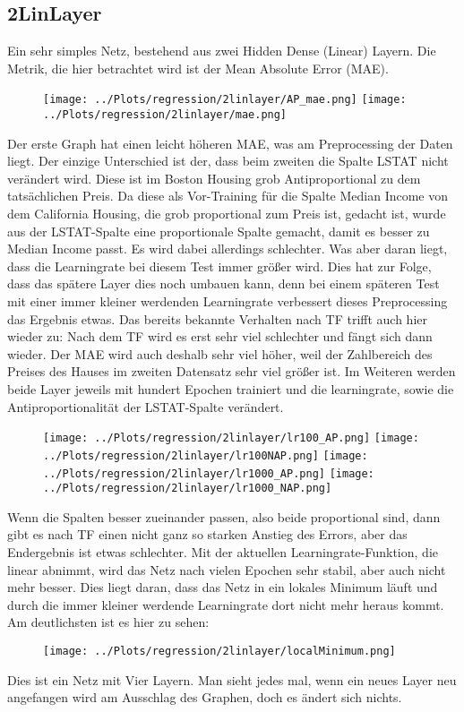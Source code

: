 \subsection{2LinLayer}
    Ein sehr simples Netz, bestehend aus zwei Hidden Dense (Linear) Layern. 
    Die Metrik, die hier betrachtet wird ist der Mean Absolute Error (MAE). 
    \begin{figure}[htpb]
        \texttt{[image: ../Plots/regression/2linlayer/AP\_mae.png]}
        \texttt{[image: ../Plots/regression/2linlayer/mae.png]}
    \end{figure}
    Der erste Graph hat einen leicht höheren MAE, was am Preprocessing der Daten liegt. 
    Der einzige Unterschied ist der, dass beim zweiten die Spalte LSTAT nicht verändert wird. 
    Diese ist im Boston Housing grob Antiproportional zu dem tatsächlichen Preis. Da diese als 
    Vor-Training für die Spalte Median Income von dem California Housing, die grob proportional 
    zum Preis ist, gedacht ist, wurde aus der LSTAT-Spalte eine proportionale Spalte gemacht, 
    damit es besser zu Median Income passt. Es wird dabei allerdings schlechter. 
    Was aber daran liegt, dass die Learningrate bei diesem Test immer größer wird. Dies hat zur 
    Folge, dass das spätere Layer dies noch umbauen kann, denn bei einem späteren Test mit 
    einer immer kleiner werdenden Learningrate verbessert dieses Preprocessing das 
    Ergebnis etwas. 
    Das bereits bekannte Verhalten nach TF trifft auch hier wieder zu: Nach dem TF wird es 
    erst sehr viel schlechter und fängt sich dann wieder. 
    Der MAE wird auch deshalb sehr viel höher, weil der Zahlbereich des Preises des Hauses im 
    zweiten Datensatz sehr viel größer ist.
    Im Weiteren werden beide Layer jeweils mit hundert Epochen trainiert und die learningrate, 
    sowie die Antiproportionalität der LSTAT-Spalte verändert. 
    \begin{figure}[htpb]
        \texttt{[image: ../Plots/regression/2linlayer/lr100\_AP.png]}
        \texttt{[image: ../Plots/regression/2linlayer/lr100NAP.png]}
        \texttt{[image: ../Plots/regression/2linlayer/lr1000\_AP.png]}
        \texttt{[image: ../Plots/regression/2linlayer/lr1000\_NAP.png]}
    \end{figure}
    Wenn die Spalten besser zueinander passen, also beide proportional sind, dann gibt es nach TF 
    einen nicht ganz so starken Anstieg des Errors, aber das Endergebnis ist etwas schlechter. 
    Mit der aktuellen Learningrate-Funktion, die linear abnimmt, wird das Netz nach vielen Epochen 
    sehr stabil, aber auch nicht mehr besser. 
    Dies liegt daran, dass das Netz in ein lokales Minimum läuft und durch die immer kleiner 
    werdende Learningrate dort nicht mehr heraus kommt. Am deutlichsten ist es hier zu sehen: 
    \begin{figure}[htpb]
        \texttt{[image: ../Plots/regression/2linlayer/localMinimum.png]}
    \end{figure}
    Dies ist ein Netz mit Vier Layern. Man sieht jedes mal, wenn ein neues Layer neu angefangen wird 
    am Ausschlag des Graphen, doch es ändert sich nichts.
